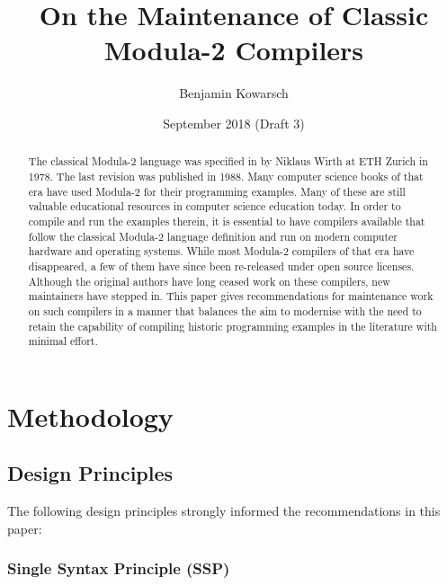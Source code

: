 \documentclass[10pt,a4paper]{article} %
\title{On the Maintenance of Classic Modula-2 Compilers}
\author{Benjamin Kowarsch}
\date{September 2018 (Draft 3)}
\makeatletter
\newcommand{\verbatimfont}[1]{\def\verbatim@font{#1}}
\makeatother
\begin{document}
\verbatimfont{\fontfamily{lmtt}\selectfont}
\maketitle

\begin{abstract}
The classical Modula-2 language was specified in \cite{Wirth78} by Niklaus Wirth at ETH Zurich in 1978. The last revision \cite{Wirth88} was published in 1988. Many computer science books of that era have used Modula-2 for their programming examples. Many of these are still valuable educational resources in computer science education today. In order to compile and run the examples therein, it is essential to have compilers available that follow the classical Modula-2 language definition and run on modern computer hardware and operating systems. While most Modula-2 compilers of that era have disappeared, a few of them have since been re-released under open source licenses. Although the original authors have long ceased work on these compilers, new maintainers have stepped in. This paper gives recommendations for maintenance work on such compilers in a manner that balances the aim to modernise with the need to retain the capability of compiling historic programming examples in the literature with minimal effort.
\end{abstract}


\section{Methodology}

\subsection{Design Principles}

The following design principles strongly informed the recommendations in this paper:

\subsubsection{Single Syntax Principle (SSP)}
\end{document}
